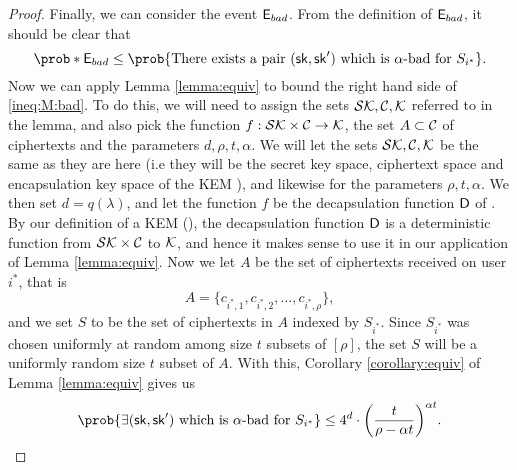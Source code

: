 \begin{proof}
  Finally, we can consider the event \(\mathsf{E}_{bad}\).
  From the definition of \(\mathsf{E}_{bad}\), it should be clear that
  \begin{equation}\label{ineq:M:bad}
    \prob*{\eventE_{bad}} \le \prob{\text{There exists a pair } (\sk,\sk') \text{ which is \(\alpha\)-bad for } S_{i^{*}}}.
  \end{equation}
  Now we can apply Lemma \ref{lemma:equiv} to bound the right hand side of \eqref{ineq:M:bad}.
  To do this, we will need to assign the sets \(\mathcal{SK}, \mathcal{C}, \mathcal{K}\) referred to in the lemma,
  and also pick the function \(f : \mathcal{SK} \times \mathcal{C} \to \mathcal{K}\),
  the set \(A \subset \mathcal{C}\) of ciphertexts and the parameters \(d,\rho,t,\alpha\).
  We will let the sets \(\mathcal{SK}, \mathcal{C}, \mathcal{K}\)
  be the same as they are here (i.e they will be the secret key space, ciphertext space and encapsulation key space of the KEM \KEM), and likewise for the parameters \(\rho, t, \alpha\).
  We then set \(d = q(\lambda)\),
  and let the function \(f\) be the decapsulation function \(\mathsf{D}\) of \KEM.
  By our definition of a KEM (), the decapsulation function
  \(\mathsf{D}\) is a deterministic function from \(\mathcal{SK} \times \mathcal{C}\) to \(\mathcal{K}\),
  and hence it makes sense to use it in our application of Lemma \ref{lemma:equiv}.
  Now we let \(A\) be the set of ciphertexts received on user \(i^{*}\), that is
  \[
    A = \{c_{i^{*},1},c_{i^{*},2},\ldots,c_{i^{*},\rho}\},
  \]
  and we set \(S\) to be the set of ciphertexts in \(A\) indexed by \(S_{i^{*}}\).
  Since \(S_{i^{*}}\) was chosen uniformly at random among size \(t\) subsets of \([\rho]\),
  the set \(S\) will be a uniformly random size \(t\) subset of \(A\).
  With this, Corollary \ref{corollary:equiv} of Lemma \ref{lemma:equiv} gives us
  \[
    \prob{\exists (\sk,\sk') \text{ which is \(\alpha\)-bad for } S_{i^{*}}}
    \le 4^{d} \cdot \left( \frac{t}{\rho - \alpha t} \right)^{\alpha t}.
  \]


\end{proof}
